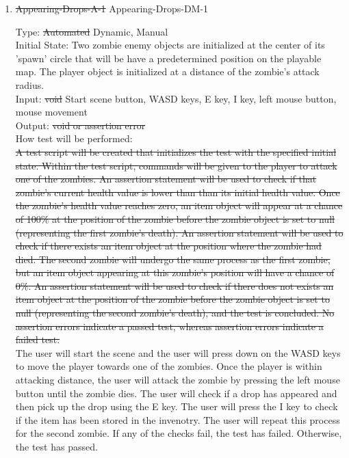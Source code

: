\documentclass[12pt, titlepage]{article}
\newcounter{ftnum}
\begin{document}
\begin{enumerate}

\item{\sout{Appearing-Drops-A-1} {\color{magenta} Appearing-Drops-DM-1}\\}  \label{F8-1}

Type: \sout{Automated} {\color{magenta} Dynamic, Manual}\\
					
Initial State: Two zombie enemy objects are initialized at the center of its 'spawn' circle that will be have a predetermined position on the playable map. The player object is initialized at a distance of the zombie's attack radius.\\
					
Input: \sout{void} {\color{magenta} Start scene button, WASD keys, E key, I key, left mouse button, mouse movement}\\
					
Output: \sout{void or assertion error} {\color{magenta} }\\
					
How test will be performed:\\ \sout{A test script will be created that initializes the test with the specified initial state. Within the test script, commands will be given to the player to attack one of the zombies. An assertion statement will be used to check if that zombie's current health value is lower than than its initial health value. Once the zombie's health value reaches zero, an item object will appear at a chance of 100\% at the position of the zombie before the zombie object is set to null (representing the first zombie's death). An assertion statement will be used to check if there exists an item object at the position where the zombie had died. The second zombie will undergo the same process as the first zombie, but an item object appearing at this zombie's position will have a chance of 0\%. An assertion statement will be used to check if there does not exists an item object at the position of the zombie before the zombie object is set to null (representing the second zombie's death), and the test is concluded. No assertion errors indicate a passed test, whereas assertion errors indicate a failed test.}\\
{\color{magenta} The user will start the scene and the user will press down on the WASD keys to move the player towards one of the zombies. Once the player is within attacking distance, the user will attack the zombie by pressing the left mouse button until the zombie dies. The user will check if a drop has appeared and then pick up the drop using the E key. The user will press the I key to check if the item has been stored in the invenotry. The user will repeat this process for the second zombie. If any of the checks fail, the test has failed. Otherwise, the test has passed.}\\

\end{enumerate}
\end{document}
